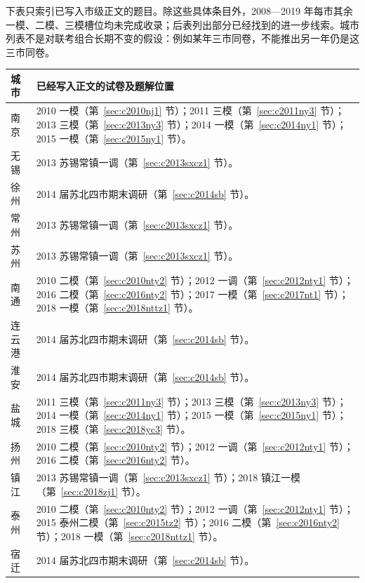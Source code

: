 \documentclass[UTF8]{ctexart}
\begin{document}
下表只索引已写入市级正文的题目。除这些具体条目外，2008—2019 年每市其余一模、二模、三模槽位均未完成收录；后表列出部分已经找到的进一步线索。城市列表不是对联考组合长期不变的假设：例如某年三市同卷，不能推出另一年仍是这三市同卷。
\begin{longtable}{p{}p{}}
\textbf{城市}&\textbf{已经写入正文的试卷及题解位置}\\\hline
南京&2010 一模（第~\ref{sec:c2010nj1} 节）；2011 三模（第~\ref{sec:c2011ny3} 节）；2013 三模（第~\ref{sec:c2013ny3} 节）；2014 一模（第~\ref{sec:c2014ny1} 节）；2015 一模（第~\ref{sec:c2015ny1} 节）。\\
无锡&2013 苏锡常镇一调（第~\ref{sec:c2013sxcz1} 节）。\\
徐州&2014 届苏北四市期末调研（第~\ref{sec:c2014sb} 节）。\\
常州&2013 苏锡常镇一调（第~\ref{sec:c2013sxcz1} 节）。\\
苏州&2013 苏锡常镇一调（第~\ref{sec:c2013sxcz1} 节）。\\
南通&2010 二模（第~\ref{sec:c2010nty2} 节）；2012 一调（第~\ref{sec:c2012nty1} 节）；2016 二模（第~\ref{sec:c2016nty2} 节）；2017 一模（第~\ref{sec:c2017nt1} 节）；2018 一模（第~\ref{sec:c2018nttz1} 节）。\\
连云港&2014 届苏北四市期末调研（第~\ref{sec:c2014sb} 节）。\\
淮安&2014 届苏北四市期末调研（第~\ref{sec:c2014sb} 节）。\\
盐城&2011 三模（第~\ref{sec:c2011ny3} 节）；2013 三模（第~\ref{sec:c2013ny3} 节）；2014 一模（第~\ref{sec:c2014ny1} 节）；2015 一模（第~\ref{sec:c2015ny1} 节）；2018 三模（第~\ref{sec:c2018yc3} 节）。\\
扬州&2010 二模（第~\ref{sec:c2010nty2} 节）；2012 一调（第~\ref{sec:c2012nty1} 节）；2016 二模（第~\ref{sec:c2016nty2} 节）。\\
镇江&2013 苏锡常镇一调（第~\ref{sec:c2013sxcz1} 节）；2018 镇江一模（第~\ref{sec:c2018zj1} 节）。\\
泰州&2010 二模（第~\ref{sec:c2010nty2} 节）；2012 一调（第~\ref{sec:c2012nty1} 节）；2015 泰州二模（第~\ref{sec:c2015tz2} 节）；2016 二模（第~\ref{sec:c2016nty2} 节）；2018 一模（第~\ref{sec:c2018nttz1} 节）。\\
宿迁&2014 届苏北四市期末调研（第~\ref{sec:c2014sb} 节）。\\\hline
\end{longtable}
\end{document}
